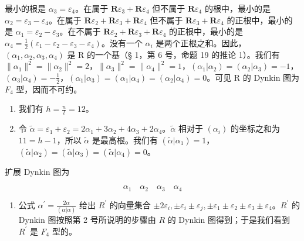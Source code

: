 最小的根是 \(\alpha_{3} = \varepsilon_{4}\)。在属于 \(\mathbf{R}\varepsilon_{3} + \mathbf{R}\varepsilon_{4}\) 但不属于 \(\mathbf{R}\varepsilon_{4}\) 的根中，最小的是 \(\alpha_{2} = \varepsilon_{3} - \varepsilon_{4}\)。在属于 \(\mathbf{R}\varepsilon_{2} + \mathbf{R}\varepsilon_{3} + \mathbf{R}\varepsilon_{4}\) 但不属于 \(\mathbf{R}\varepsilon_{3} + \mathbf{R}\varepsilon_{4}\) 的正根中，最小的是 \(\alpha_{1} = \varepsilon_{2} - \varepsilon_{3}\)。在不属于 \(\mathbf{R}\varepsilon_{2} + \mathbf{R}\varepsilon_{3} + \mathbf{R}\varepsilon_{4}\) 的正根中，最小的是 \(\alpha_{4} = \frac{1}{2} (\varepsilon_{1} - \varepsilon_{2} - \varepsilon_{3} - \varepsilon_{4})\)。没有一个 \(\alpha_{i}\) 是两个正根之和。因此，\((\alpha_{1},\alpha_{2},\alpha_{3},\alpha_{4})\) 是 R 的一个基（§ 1，第 6 号，命题 19 的推论 1）。我们有 \(\| \alpha_1 \|^2 = \| \alpha_2 \|^2 = 2\)，\(\| \alpha_3 \|^2 = \| \alpha_4 \|^2 = 1\)，\((\alpha_1|\alpha_2) = (\alpha_2|\alpha_3) = -1\)，\((\alpha_3|\alpha_4) = -\frac{1}{2}\)，\((\alpha_1|\alpha_3) = (\alpha_1|\alpha_4) = (\alpha_2|\alpha_4) = 0\)。可见 R 的 Dynkin 图为 \(F_4\) 型，因而不可约。

\begin{enumerate}
\def\labelenumi{(\Roman{enumi})}
\setcounter{enumi}{2}
\item
  我们有 \(h = \frac{n}{l} = 12\)。
\item
  令 \(\tilde{\alpha} = \varepsilon_1 + \varepsilon_2 = 2\alpha_1 + 3\alpha_2 + 4\alpha_3 + 2\alpha_4\)。\(\tilde{\alpha}\) 相对于 \((\alpha_i)\) 的坐标之和为 \(11 = h - 1\)，所以 \(\tilde{\alpha}\) 是最高根。我们有 \((\tilde{\alpha}|\alpha_1) = 1\)，\((\tilde{\alpha}|\alpha_2) = (\tilde{\alpha}|\alpha_3) = (\tilde{\alpha}|\alpha_4) = 0\)。
\end{enumerate}

扩展 Dynkin 图为

\[
\alpha_ {1} \quad \alpha_ {2} \quad \alpha_ {3} \quad \alpha_ {4}
\]

\begin{enumerate}
\def\labelenumi{(\Alph{enumi})}
\setcounter{enumi}{21}
\tightlist
\item
  公式 \(\alpha^{\prime} = \frac{2\alpha}{(\alpha|\alpha)}\) 给出 \(R^{\prime}\) 的向量集合 \(\pm 2\varepsilon_{i}, \pm \varepsilon_{i} \pm \varepsilon_{j}, \pm \varepsilon_{1} \pm \varepsilon_{2} \pm \varepsilon_{3} \pm \varepsilon_{4}\)。\(R^{\prime}\) 的 Dynkin 图按照第 2 号所说明的步骤由 \(R\) 的 Dynkin 图得到；于是我们看到 \(R^{\prime}\) 是 \(F_{4}\) 型的。
\end{enumerate}

